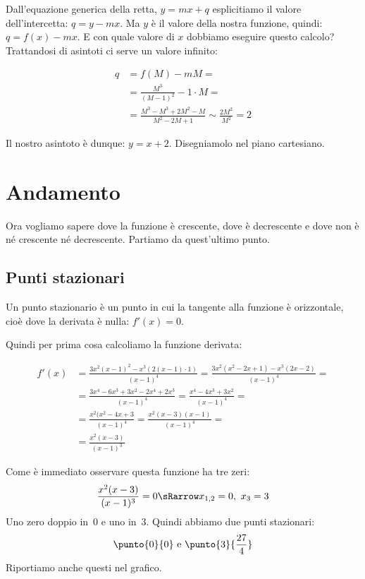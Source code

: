 Dall'equazione generica della retta, \(y=mx+q\) esplicitiamo il valore 
dell'intercetta: \(q=y-mx\). 
Ma \(y\) è il valore della nostra funzione, quindi: \(q=f(x)-mx\). 
E con quale valore di \(x\) dobbiamo eseguire questo calcolo? 
Trattandosi di asintoti ci serve un valore infinito:

\begin{minipage}{.60\linewidth}
\begin{align*}
 q &= f(M)-mM = \\
   &= \frac{M^3}{(M-1)^2}-1 \cdot M =\\
   &= \frac{M^3-M^3 +2M^2 -M}{M^2 -2M +1} \sim \frac{2M^2}{M^2} = 2
\end{align*}

Il nostro asintoto è dunque: \(y=x+2\).
Disegniamolo nel piano cartesiano.
\end{minipage}
\hfill
\begin{minipage}{.38\linewidth}
 \begin{center}
\asintotifunzionea
 \end{center}
\end{minipage}

\section{Andamento}
\label{sec:03_andamento}

Ora vogliamo sapere dove la funzione è crescente, dove è decrescente e dove 
non è né crescente né decrescente. Partiamo da quest'ultimo punto.

\subsection{Punti stazionari}

Un punto stazionario è un punto in cui la tangente alla funzione è 
orizzontale, cioè dove la derivata è nulla: \(f'(x)=0\).

Quindi per prima cosa calcoliamo la funzione derivata:

\begin{align*}
f'(x) &= \frac{3x^2(x-1)^2-x^3(2(x-1)\cdot 1)}{(x-1)^4} =
       \frac{3x^2(x^2-2x+1)-x^3(2x-2)}{(x-1)^4} =\\
      &= \frac{3x^4-6x^3+3x^2-2x^4+2x^3}{(x-1)^4} =
       \frac{x^4-4x^3+3x^2}{(x-1)^4} =\\
      &= \frac{x^2(x^2-4x+3}{(x-1)^4} =
       \frac{x^2(x-3)(x-1)}{(x-1)^4} =\\
      &= \frac{x^2(x-3)}{(x-1)^3}
\end{align*}
\begin{minipage}{.60\linewidth}
Come è immediato osservare questa funzione ha tre zeri:
\[\frac{x^2(x-3)}{(x-1)^3}=0 \sRarrow x_{1,2}=0,~x_3=3\]
Uno zero doppio in~0 e uno in~3.
Quindi abbiamo due punti stazionari:
\[\punto{0}{0} \text{ e } \punto{3} {\frac{27}{4}}\]
Riportiamo anche questi nel grafico.
\end{minipage}
\hfill
\begin{minipage}{.38\linewidth}
 \begin{center}
\stazionarifunzionea
 \end{center}
\end{minipage}


